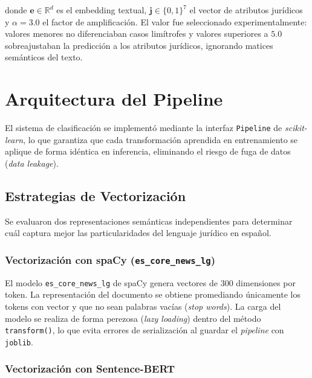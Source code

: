 donde $\mathbf{e} \in \mathbb{R}^{d}$ es el embedding textual,
$\mathbf{j} \in \{0,1\}^{7}$ el vector de atributos jurídicos y
$\alpha = 3.0$ el factor de amplificación. El valor fue seleccionado
experimentalmente: valores menores no diferenciaban casos limítrofes y
valores superiores a $5.0$ sobreajustaban la predicción a los atributos
jurídicos, ignorando matices semánticos del texto.

\section{Arquitectura del Pipeline}
\label{sec:arquitectura_pipeline}

El sistema de clasificación se implementó mediante la interfaz
\texttt{Pipeline} de \textit{scikit-learn}, lo que garantiza que cada
transformación aprendida en entrenamiento se aplique de forma idéntica en
inferencia, eliminando el riesgo de fuga de datos
(\textit{data leakage}).\cite{pedregosa2011}

\subsection{Estrategias de Vectorización}
\label{subsec:vectorizacion}

Se evaluaron dos representaciones semánticas independientes para determinar
cuál captura mejor las particularidades del lenguaje jurídico en español.

\subsubsection{Vectorización con spaCy (\texttt{es\_core\_news\_lg})}

El modelo \texttt{es\_core\_news\_lg} de spaCy\cite{honnibal2020} genera vectores de
300 dimensiones por token. La representación del documento se obtiene
promediando únicamente los tokens con vector y que no sean palabras vacías
(\textit{stop words}). La carga del modelo se realiza de forma perezosa
(\textit{lazy loading}) dentro del método \texttt{transform()}, lo que
evita errores de serialización al guardar el \textit{pipeline} con
\texttt{joblib}.

\subsubsection{Vectorización con Sentence-BERT}


